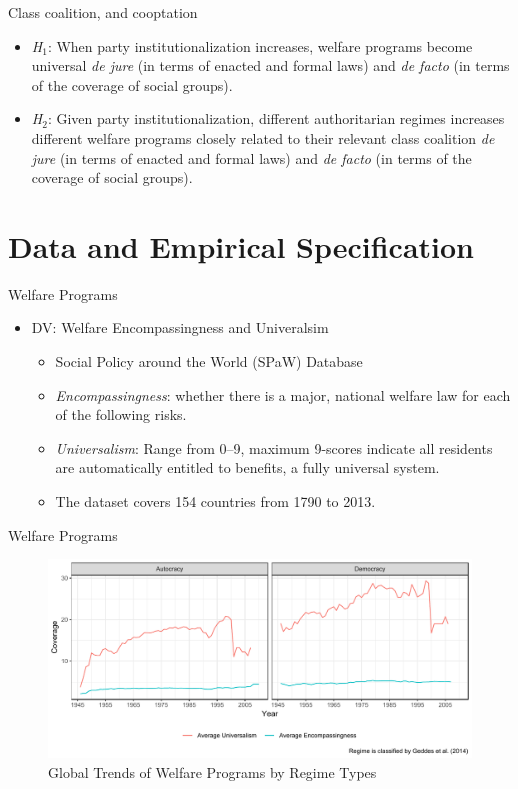 \documentclass{Bredelebeamer}
\begin{document}
\begin{frame}{Class coalition, and cooptation}
\begin{itemize}
  \item \textit{H$_1$}: When party institutionalization increases, welfare programs become universal \textit{de jure} (in terms of enacted and formal laws) and \textit{de facto} (in terms of the coverage of social groups).
  \item \textit{H$_2$}: Given party institutionalization, different authoritarian regimes increases different welfare programs closely related to their relevant class coalition \textit{de jure} (in terms of enacted and formal laws) and \textit{de facto} (in terms of the coverage of social groups).
\end{itemize}
\end{frame}

\section{Data and Empirical Specification}
\begin{frame}{Welfare Programs}
	\begin{itemize}
		\item DV: Welfare Encompassingness and Univeralsim
		\begin{itemize}
			\item Social Policy around the World (SPaW) Database \citep{Rasmussen2016}
			\item \textit{Encompassingness}: whether there is a major, national welfare law for each of the following risks.
			\item \textit{Universalism}: Range from 0–9, maximum 9-scores indicate all residents are automatically entitled to benefits, a fully universal system.
			\item The dataset covers 154 countries from 1790 to 2013.
		\end{itemize} 
	\end{itemize}
\end{frame}	

\begin{frame}{Welfare Programs}
\begin{figure}
	\centering
	\includegraphics[width=0.7\linewidth]{"../4. Figures/Figure0"}
	\caption{Global Trends of Welfare Programs by Regime Types}
	\label{fig:figure0}
\end{figure}
\end{frame}	
\end{document}

